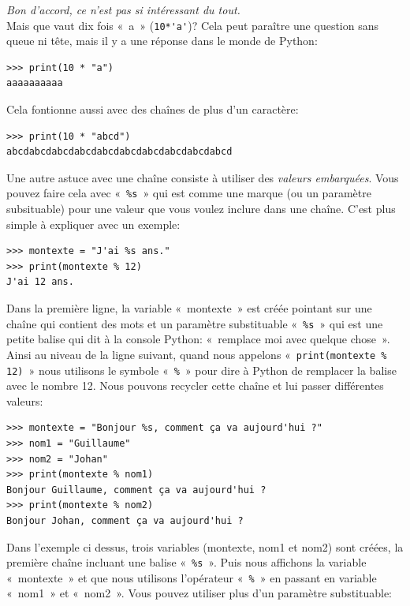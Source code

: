   \emph{Bon d'accord, ce n'est pas si intéressant du tout.}\\

Mais que vaut dix fois «~a~» (\verb+10*'a'+)? Cela peut paraître une question sans queue ni tête, mais il y a une réponse dans le monde de Python:

\begin{Verbatim}[frame=single,rulecolor=\color{mbleu}, label=à taper]
>>> print(10 * "a")
aaaaaaaaaa
\end{Verbatim}
Cela fontionne aussi avec des chaînes de plus d'un caractère:

\begin{Verbatim}[frame=single,rulecolor=\color{mbleu}, label=à taper]
>>> print(10 * "abcd")
abcdabcdabcdabcdabcdabcdabcdabcdabcdabcd
\end{Verbatim}

Une autre astuce avec une chaîne consiste à utiliser des \emph{valeurs embarquées}.\index{\%} 
Vous pouvez faire cela avec «~\texttt{\%s}~» qui est comme une marque (ou un paramètre subsituable) pour une valeur que vous voulez inclure dans une chaîne. C'est plus simple à expliquer avec un exemple: 

\begin{Verbatim}[frame=single,rulecolor=\color{mbleu}, label=à taper]
>>> montexte = "J'ai %s ans."
>>> print(montexte % 12)
J'ai 12 ans.
\end{Verbatim}

Dans la première ligne, la variable «~montexte~» est créée pointant sur une chaîne qui contient des mots et un paramètre substituable «~\texttt{\%s}~» qui est une petite balise qui dit à la console Python: «~remplace moi avec quelque chose~». Ainsi au niveau de la ligne suivant, quand nous appelons «~\texttt{print(montexte \% 12)}~» nous utilisons le symbole «~\texttt{\%}~» pour dire à Python de remplacer la balise avec le nombre 12.
Nous pouvons recycler cette chaîne et lui passer différentes valeurs:

\begin{Verbatim}[frame=single,rulecolor=\color{mbleu}, label=à taper]
>>> montexte = "Bonjour %s, comment ça va aujourd'hui ?"
>>> nom1 = "Guillaume"
>>> nom2 = "Johan"
>>> print(montexte % nom1)
Bonjour Guillaume, comment ça va aujourd'hui ?
>>> print(montexte % nom2)
Bonjour Johan, comment ça va aujourd'hui ?
\end{Verbatim}

Dans l'exemple ci dessus, trois variables (montexte, nom1 et nom2) sont créées, la première chaîne incluant une balise «~\texttt{\%s}~». Puis nous affichons la variable «~montexte~» et que nous utilisons l'opérateur «~\texttt{\%}~»  en passant en variable «~nom1~» et «~nom2~». Vous pouvez utiliser plus d'un paramètre substituable:

